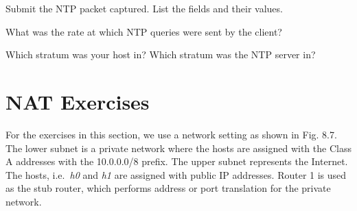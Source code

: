 \documentclass{../UTNetLab}
\begin{document}
    \begin{report}
    \item Submit the NTP packet captured. List the fields and their values.
    
    \item What was the rate at which NTP queries were sent by the client?
    
    \item Which stratum was your host in? Which stratum was the NTP server in?
    \end{report}

\part{NAT Exercises}
    For the exercises in this section, we use a network setting as shown in Fig. 8.7. The lower subnet is a private network where the hosts are assigned with the Class A addresses with the 10.0.0.0/8 prefix. The upper subnet represents the Internet. The hosts, i.e.\  \textit{h0} and \textit{h1} are assigned with public IP addresses. Router 1 is used as the stub router, which performs address or port translation for the private network.
\end{document}
